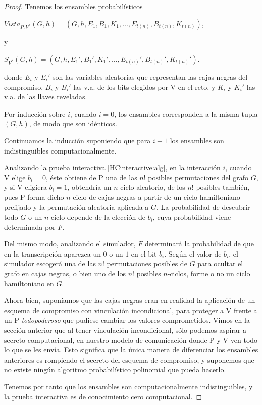\begin{proof}
	Tenemos los ensambles probabilísticos 
	\begin{center}
		$Vista_{P,V^*}(G,h) = (G,h,E_1,B_1,K_1,\dots , E_{t(n)}, B_{t(n)}, K_{t(n)})$,
	\end{center}
	y 
	\begin{center}
		$S_{V^*}(G,h) = (G,h,E_1',B_1',K_1',\dots , E_{t(n)}', B_{t(n)}', K_{t(n)}')$.
	\end{center}
	donde $E_i$ y $E_i'$ son las variables aleatorias que representan las cajas negras del compromiso, $B_i$ y $B_i'$ las v.a. de los bits elegidos por V en el reto, y $K_i$ y $K_i'$ las v.a. de las llaves reveladas.
	
	Por inducción sobre $i$, cuando $i=0$, los ensambles corresponden a la misma tupla $(G,h)$, de modo que son idénticos.
	
	Continuamos la inducción suponiendo que para $i-1$ los ensambles son indistinguibles computacionalmente. 
	
	Analizando la prueba interactiva \ref{HCinteractive:alg}, en la interacción $i$, cuando V elige $b_{i}=0$, éste obtiene de P una de las $n!$ posibles permutaciones del grafo $G$, y si V eligiera $b_i=1$, obtendría un $n$-ciclo aleatorio, de los $n!$ posibles también, pues P forma dicho $n$-ciclo de cajas negras a partir de un ciclo hamiltoniano prefijado y la permutación aleatoria aplicada a $G$. La probabilidad de descubrir todo $G$ o un $n$-ciclo depende de la elección de $b_i$, cuya probabilidad viene determinada por $F$.
	
	Del mismo modo, analizando el simulador,  $F$ determinará la probabilidad de que en la transcripción aparezca un $0$ o un $1$ en el bit $b_i$. Según el valor de $b_i$, el simulador escogerá una de las $n!$ permutaciones posibles de $G$ para ocultar el grafo en cajas negras, o bien uno de los $n!$ posibles $n$-ciclos, forme o no un ciclo hamiltoniano en $G$.
	
	Ahora bien, suponíamos que las cajas negras eran en realidad la aplicación de un esquema de compromiso con vinculación incondicional, para proteger a V frente a un P \textit{todopoderoso} que pudiese cambiar los valores comprometidos. Vimos en la sección anterior que al tener vinculación incondicional, sólo podemos aspirar a secreto computacional, en nuestro modelo de comunicación donde P y V ven todo lo que se les envía. Esto significa que la única manera de diferenciar los ensambles anteriores es rompiendo el secreto del esquema de compromiso, y suponemos que no existe ningún algoritmo probabilístico polinomial que pueda hacerlo.
	
	Tenemos por tanto que los ensambles son computacionalmente indistinguibles, y la prueba interactiva es de conocimiento cero computacional.
\end{proof}




